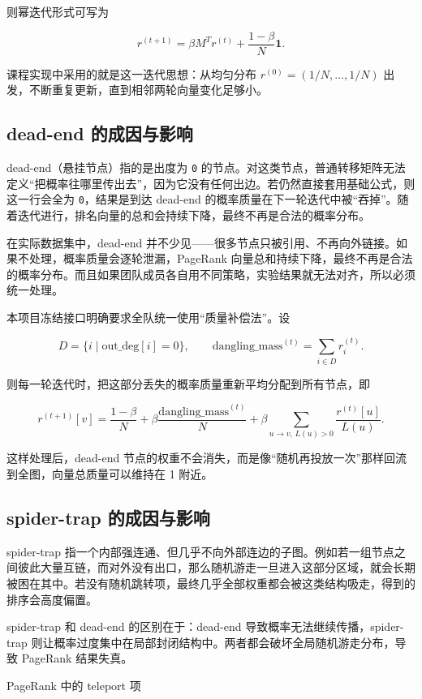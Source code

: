 \documentclass[UTF8,a4paper,12pt]{ctexart}
\begin{document}
则幂迭代形式可写为


\[ r^{(t+1)}=\beta M^{T}r^{(t)}+\frac{1-\beta}{N}\mathbf{1}. \]


课程实现中采用的就是这一迭代思想：从均匀分布 $r^{(0)} = (1/N, \dots, 1/N)$ 出发，不断重复更新，直到相邻两轮向量变化足够小。


\subsection{dead-end 的成因与影响}


dead-end（悬挂节点）指的是出度为 \texttt{0} 的节点。对这类节点，普通转移矩阵无法定义“把概率往哪里传出去”，因为它没有任何出边。若仍然直接套用基础公式，则这一行会全为 \texttt{0}，结果是到达 dead-end 的概率质量在下一轮迭代中被“吞掉”。随着迭代进行，排名向量的总和会持续下降，最终不再是合法的概率分布。


在实际数据集中，dead-end 并不少见——很多节点只被引用、不再向外链接。如果不处理，概率质量会逐轮泄漏，PageRank 向量总和持续下降，最终不再是合法的概率分布。而且如果团队成员各自用不同策略，实验结果就无法对齐，所以必须统一处理。


本项目冻结接口明确要求全队统一使用“质量补偿法”。设


\[ D=\{i \mid \mathrm{out\_deg}[i]=0\}, \qquad \mathrm{dangling\_mass}^{(t)}=\sum_{i \in D} r_i^{(t)}. \]


则每一轮迭代时，把这部分丢失的概率质量重新平均分配到所有节点，即


\[ r^{(t+1)}[v] = \frac{1-\beta}{N} + \beta \frac{\mathrm{dangling\_mass}^{(t)}}{N} + \beta \sum_{u \to v,\, L(u)>0}\frac{r^{(t)}[u]}{L(u)}. \]


这样处理后，dead-end 节点的权重不会消失，而是像“随机再投放一次”那样回流到全图，向量总质量可以维持在 1 附近。


\subsection{spider-trap 的成因与影响}


spider-trap 指一个内部强连通、但几乎不向外部连边的子图。例如若一组节点之间彼此大量互链，而对外没有出口，那么随机游走一旦进入这部分区域，就会长期被困在其中。若没有随机跳转项，最终几乎全部权重都会被这类结构吸走，得到的排序会高度偏置。


spider-trap 和 dead-end 的区别在于：dead-end 导致概率无法继续传播，spider-trap 则让概率过度集中在局部封闭结构中。两者都会破坏全局随机游走分布，导致 PageRank 结果失真。


PageRank 中的 teleport 项
\end{document}
